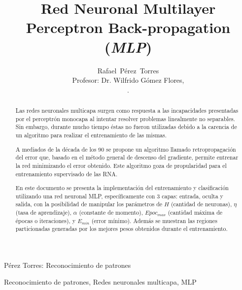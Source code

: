 \documentclass[journal]{IEEEtran}
\begin{document}

\title{Red Neuronal Multilayer Perceptron Back-propagation (\emph{MLP})}

\author{Rafael~Pérez~Torres \\
	Profesor: Dr. Wilfrido Gómez Flores,\\[6pt].
	
}

%
{Pérez Torres: Reconocimiento de patrones}

\maketitle

\begin{abstract}
Las redes neuronales multicapa surgen como respuesta a las incapacidades presentadas por el perceptrón monocapa al intentar resolver problemas linealmente no separables.
Sin embargo, durante mucho tiempo éstas no fueron utilizadas debido a la carencia de un algoritmo para realizar el entrenamiento de las mismas.

A mediados de la década de los 90 se propone un algoritmo llamado retropropagación del error que, basado en el método general de descenso del gradiente, permite entrenar la red minimizando el error obtenido.
Este algoritmo goza de propularidad para el entrenamiento supervisado de las RNA.

En este documento se presenta la implementación del entrenamiento y clasificación utilizando una red neuronal MLP, específicamente con 3 capas: entrada, oculta y salida, con la posibilidad de manipular los parámetros de $H$ (cantidad de neuronas), $\eta$ (tasa de aprendizaje), $\alpha$ (constante de momento), $Epoc_{max}$ (cantidad máxima de épocas o iteraciones), y $E_{min}$ (error mínimo).
Además se muestran las regiones particionadas generadas por los mejores pesos obtenidos durante el entrenamiento.
\end{abstract}

\begin{IEEEkeywords}
Reconocimiento de patrones, Redes neuronales multicapa, MLP
\end{IEEEkeywords}
\end{document}
